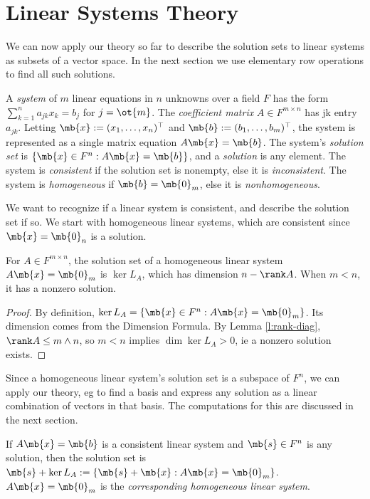 \section{Linear Systems Theory}
We can now apply our theory so far to describe the solution sets to linear systems as subsets of a vector space. In the next section we use elementary row operations to find all such solutions.
\begin{defn}
A \emph{system} of $m$ linear equations in $n$ unknowns over a field $F$ has the form $\sum_{k=1}^na_{jk}x_k=b_j$ for $j=\ot{m}$. The \emph{coefficient matrix} $A \in F^{m \times n}$ has jk entry $a_{jk}$. Letting $\mb{x}:=(x_1, \ldots,x_n)^\top$ and $\mb{b}:=(b_1, \ldots,b_m)^\top$, the system is represented as a single matrix equation $A \mb{x}=\mb{b}$. The system's \emph{solution set} is $\{ \mb{x}\in F^{n}:A \mb{x}=\mb{b}\}$, and a \emph{solution} is any element. The system is \emph{consistent} if the solution set is nonempty, else it is \emph{inconsistent}. The system is \emph{homogeneous} if $\mb{b}=\mb{0}_m$, else it is \emph{nonhomogeneous}.
\end{defn}
We want to recognize if a linear system is consistent, and describe the solution set if so. We start with homogeneous linear systems, which are consistent since $\mb{x}=\mb{0}_n$ is a solution.
\begin{lem}\label{l:hom-ker}
For $A \in F^{m \times n}$, the solution set of a homogeneous linear system $A \mb{x}=\mb{0}_m$ is $\ker L_A$, which has dimension $n- \rank A$. When $m<n$, it has a nonzero solution.
\end{lem}
\begin{proof}%
By definition, $\ker L_A= \{ \mb{x}\in F^n:A \mb{x}=\mb{0}_m \}$. Its dimension comes from the Dimension Formula. By Lemma \ref{l:rank-diag}, $\rank A \leq m \wedge n$, so $m<n$ implies $\dim \ker L_A>0$, ie a nonzero solution exists.
\end{proof}
Since a homogeneous linear system's solution set is a subspace of $F^n$, we can apply our theory, eg to find a basis and express any solution as a linear combination of vectors in that basis. The computations for this are discussed in the next section.
\begin{lem}\label{l:particular+hom}
If $A \mb{x}=\mb{b}$ is a consistent linear system and $\mb{s}\in F^n$ is any solution, then the solution set is $\mb{s}+\ker L_A:= \{ \mb{s}+\mb{x}:A \mb{x}=\mb{0}_m \}$. $A \mb{x}= \mb{0}_m$ is the \emph{corresponding homogeneous linear system}.
\end{lem}
